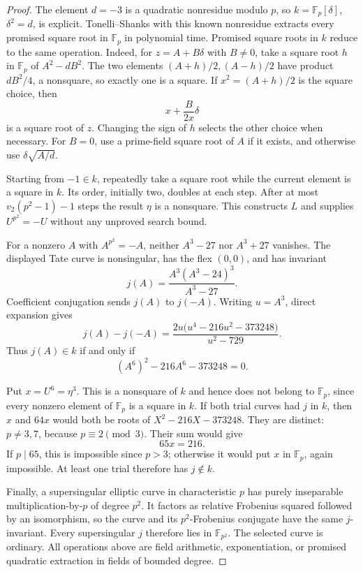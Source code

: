 \documentclass[11pt]{article}
\theoremstyle{definition}
\theoremstyle{remark}
\begin{document}
\begin{proof}
The element $d=-3$ is a quadratic nonresidue modulo $p$, so
$k=\mathbb F_p[\delta]$, $\delta^2=d$, is explicit.
Tonelli--Shanks with this known nonresidue extracts every
promised square root in $\mathbb F_p$ in polynomial time.
Promised square roots in $k$ reduce to the same operation.
Indeed, for $z=A+B\delta$ with $B\ne0$, take a square root
$h$ in $\mathbb F_p$ of $A^2-dB^2$.  The two elements
$(A+h)/2,(A-h)/2$ have product $dB^2/4$, a nonsquare, so
exactly one is a square.  If $x^2=(A+h)/2$ is the square
choice, then
\[
 x+\frac{B}{2x}\delta
\]
is a square root of $z$.  Changing the sign of $h$ selects the
other choice when necessary.  For $B=0$, use a prime-field
square root of $A$ if it exists, and otherwise use
$\delta\sqrt{A/d}$.

Starting from $-1\in k$, repeatedly take a square root while
the current element is a square in $k$.  Its order, initially
two, doubles at each step.  After at most $v_2(p^2-1)-1$
steps the result $\eta$ is a nonsquare.  This constructs $L$
and supplies $U^{p^2}=-U$ without any unproved search bound.

For a nonzero $A$ with $A^{p^2}=-A$, neither $A^3-27$ nor
$A^3+27$ vanishes.  The displayed Tate curve is nonsingular,
has the flex $(0,0)$, and has invariant
\[
 j(A)=\frac{A^3(A^3-24)^3}{A^3-27}.
\]
Coefficient conjugation sends $j(A)$ to $j(-A)$.
Writing $u=A^3$, direct expansion gives
\[
 j(A)-j(-A)
 =\frac{2u\bigl(u^4-216u^2-373248\bigr)}{u^2-729}.
\]
Thus $j(A)\in k$ if and only if
\[
 (A^6)^2-216A^6-373248=0.
\]

Put $x=U^6=\eta^3$.  This is a nonsquare of $k$ and hence
does not belong to $\mathbb F_p$, since every nonzero element
of $\mathbb F_p$ is a square in $k$.  If both trial curves had
$j$ in $k$, then $x$ and $64x$ would both be roots of
$X^2-216X-373248$.  They are distinct: $p\ne3,7$, because
$p\equiv2\pmod3$.  Their sum would give
\[
 65x=216.
\]
If $p\mid65$, this is impossible since $p>3$; otherwise it
would put $x$ in $\mathbb F_p$, again impossible.
At least one trial therefore has $j\notin k$.

Finally, a supersingular elliptic curve in characteristic $p$
has purely inseparable multiplication-by-$p$ of degree $p^2$.
It factors as relative Frobenius squared followed by an
isomorphism, so the curve and its $p^2$-Frobenius conjugate
have the same $j$-invariant.  Every supersingular $j$ therefore
lies in $\mathbb F_{p^2}$.  The selected curve is ordinary.
All operations above are field arithmetic, exponentiation,
or promised quadratic extraction in fields of bounded degree.
\end{proof}
\end{document}
